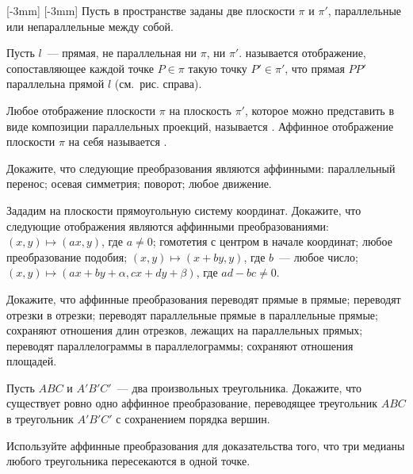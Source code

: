 \documentclass[a4paper,12pt]{article}
\newcommand{\rightpicture}[4]%
{\ifthenelse{\lengthtest{10mm>#3mm}}%
{\marginnote{\hbox to #1 {\hss\texttt{[image: \#4]}}}[-#2]}%
{\marginnote{\hbox to #1 {\hss\texttt{[image: \#4]}}}[-#2]}}
\begin{document}



\rightpicture{0mm}{3mm}{45mm}{affine_geom-1}
  Пусть в пространстве заданы две
плоскости $\pi$ и $\pi'$, параллельные или непараллельные между
собой.

Пусть $l$~--- прямая, не параллельная ни $\pi$, ни $\pi'$.
 называется
отображение, сопоставляющее каждой точке $P\in\pi$ такую точку
$P'\in\pi'$, что прямая $PP'$ параллельна прямой $l$ (см.~рис.
справа).

Любое отображение плоскости $\pi$ на плоскость $\pi'$, которое можно
представить в виде композиции параллельных проекций, называется
. Аффинное отображение плоскости $\pi$ на себя
называется . 

 Докажите, что следующие преобразования являются аффинными:
  параллельный перенос;  осевая симметрия;
 поворот;  любое движение. 

 Зададим на плоскости прямоугольную систему координат.
Докажите, что следующие отображения являются аффинными
преобразованиями:   $(x,y)\mapsto(a x,y)$, где
$a\ne0$;  гомотетия с центром в начале координат;  любое
преобразование подобия;  $(x,y)\mapsto(x + by, y)$, где
$b$~--- любое число;  $(x,y)\mapsto(ax + by + \alpha, cx + dy
+ \beta)$, где $ad - bc \ne 0$. 

 Докажите, что аффинные преобразования  
переводят прямые в прямые;  переводят отрезки в отрезки;
 переводят параллельные прямые в параллельные прямые; 
сохраняют отношения длин отрезков, лежащих на параллельных прямых;
 переводят параллелограммы в параллелограммы;  сохраняют
отношения площадей. 

 Пусть $ABC$ и $A'B'C'$~--- два произвольных треугольника.
Докажите, что существует ровно одно аффинное преобразование,
переводящее треугольник $ABC$ в треугольник $A'B'C'$ с сохранением
порядка вершин. 


\vspace{-4mm}

 Используйте аффинные преобразования для доказательства того,
что три медианы любого треугольника пересекаются в одной точке.
\end{document}
